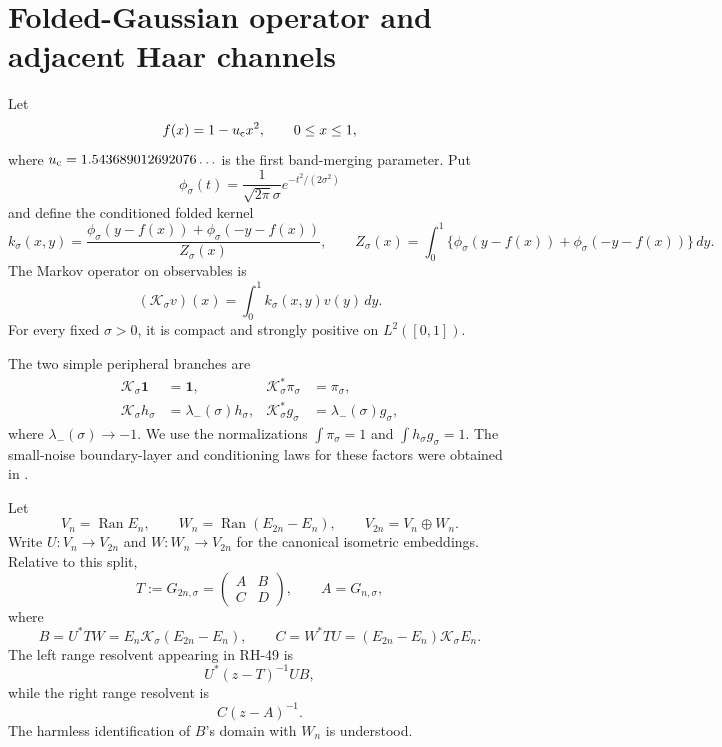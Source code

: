 \documentclass[11pt]{article}
\theoremstyle{definition}
\theoremstyle{remark}
\newcommand{\cK}{\mathcal K}
\newcommand{\Ran}{\operatorname{Ran}}
\begin{document}
\section{Folded-Gaussian operator and adjacent Haar channels}
\label{sec:setup}

Let
\begin{equation}
 f(x)=1-u_{\rm c}x^2,
 \qquad 0\le x\le1,
 \label{eq:map}
\end{equation}
where \(u_{\rm c}=1.543689012692076\ldots\) is the first band-merging
parameter.  Put
\[
 \phi_\sigma(t)=\frac{1}{\sqrt{2\pi}\sigma}
 e^{-t^2/(2\sigma^2)}
\]
and define the conditioned folded kernel
\begin{equation}
 k_\sigma(x,y)
 =
 \frac{\phi_\sigma(y-f(x))+\phi_\sigma(-y-f(x))}
 {Z_\sigma(x)},
 \qquad
 Z_\sigma(x)=\int_0^1
 \{\phi_\sigma(y-f(x))+\phi_\sigma(-y-f(x))\}\,dy.
 \label{eq:kernel}
\end{equation}
The Markov operator on observables is
\begin{equation}
 (\cK_\sigma v)(x)=\int_0^1k_\sigma(x,y)v(y)\,dy.
 \label{eq:markov}
\end{equation}
For every fixed \(\sigma>0\), it is compact and strongly positive on
\(L^2([0,1])\).

The two simple peripheral branches are
\begin{align}
 \cK_\sigma\mathbf1&=\mathbf1,
 &
 \cK_\sigma^*\pi_\sigma&=\pi_\sigma,
 \label{eq:perron-factors}\\
 \cK_\sigma h_\sigma&=\lambda_-(\sigma)h_\sigma,
 &
 \cK_\sigma^*g_\sigma&=\lambda_-(\sigma)g_\sigma,
 \label{eq:parity-factors}
\end{align}
where \(\lambda_-(\sigma)\to-1\).  We use the normalizations
\(\int\pi_\sigma=1\) and
\(\int h_\sigma g_\sigma=1\).  The small-noise boundary-layer and
conditioning laws for these factors were obtained in
\citep{WangBoundaryLayer2026,WangLogConditioning2026}.

Let
\[
 V_n=\Ran E_n,
 \qquad
 W_n=\Ran(E_{2n}-E_n),
 \qquad
 V_{2n}=V_n\oplus W_n.
\]
Write \(U:V_n\to V_{2n}\) and \(W:W_n\to V_{2n}\) for the canonical
isometric embeddings.  Relative to this split,
\begin{equation}
 T:=G_{2n,\sigma}
 =
 \begin{pmatrix}
  A&B\\ C&D
 \end{pmatrix},
 \qquad
 A=G_{n,\sigma},
 \label{eq:block}
\end{equation}
where
\begin{equation}
 B=U^*TW=E_n\cK_\sigma(E_{2n}-E_n),
 \qquad
 C=W^*TU=(E_{2n}-E_n)\cK_\sigma E_n.
 \label{eq:couplings}
\end{equation}
The left range resolvent appearing in RH-49 is
\[
 U^*(z-T)^{-1}UB,
\]
while the right range resolvent is
\[
 C(z-A)^{-1}.
\]
The harmless identification of \(B\)'s domain with \(W_n\) is understood.
\end{document}
